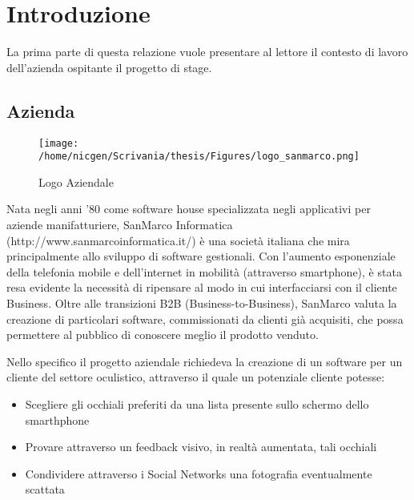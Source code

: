 
\chapter{Introduzione} %

\label{Chapter1} %


La prima parte di questa relazione vuole presentare al lettore il contesto di lavoro dell'azienda ospitante il progetto di stage.



\section{Azienda}
\begin{figure}[h]\centering  
\texttt{[image: /home/nicgen/Scrivania/thesis/Figures/logo\_sanmarco.png]}
\caption[Logo Aziendale]{Logo Aziendale}
\label{pic-a}
\end{figure}

Nata negli anni '80 come software house specializzata negli applicativi per aziende manifatturiere, SanMarco Informatica (http://www.sanmarcoinformatica.it/) è una società italiana che mira principalmente allo sviluppo di software gestionali. Con l'aumento esponenziale della telefonia mobile e dell'internet in mobilità (attraverso smartphone), è stata resa evidente la necessità di ripensare al modo in cui interfacciarsi con il cliente Business. Oltre alle transizioni B2B (Business-to-Business), SanMarco valuta la creazione di particolari software, commissionati da clienti già acquisiti, che possa permettere al pubblico di conoscere meglio il prodotto venduto. 

Nello specifico il progetto aziendale richiedeva la creazione di un software per un cliente del settore oculistico, attraverso il quale un potenziale cliente potesse:

\begin{itemize}
\item Scegliere gli occhiali preferiti da una lista presente sullo schermo dello smarthphone
\item Provare attraverso un feedback visivo, in realtà aumentata, tali occhiali
\item Condividere attraverso i Social Networks una fotografia eventualmente scattata
\end{itemize}

